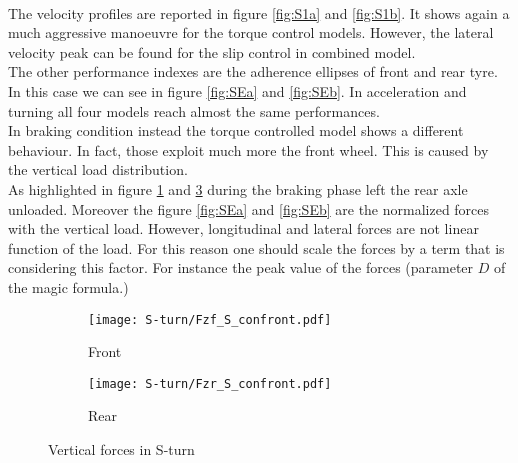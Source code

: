 %
\\
%
The velocity profiles are reported in figure \ref{fig:S1a} and \ref{fig:S1b}. It shows again a much aggressive manoeuvre for the torque control models. However, the lateral velocity peak can be found for the slip control in combined model.\\
The other performance indexes are the adherence ellipses of front and rear tyre. In this case we can see in figure \ref{fig:SEa} and \ref{fig:SEb}. In acceleration and turning all four models reach almost the same performances.\\
In braking condition instead the torque controlled model shows a different behaviour. In fact, those exploit much more the front wheel. This is caused by the vertical load distribution.\\ 
As highlighted in figure \ref{fig:SFZF} and \ref{fig:SFZR} during the braking phase left the rear axle unloaded. Moreover the figure \ref{fig:SEa} and \ref{fig:SEb} are the normalized forces with the vertical load. However, longitudinal and lateral forces are not linear function of the load. For this reason one should scale the forces by a term that is considering this factor. For instance the peak value of the forces (parameter $D$ of the magic formula\cite{pacejka2012tire}.)  
%
\begin{figure}[!htb]
    \begin{subfigure}{0.5\linewidth}
        \texttt{[image: S-turn/Fzf\_S\_confront.pdf]}
        \caption{Front}
        \label{fig:SFZF}
    \end{subfigure}%
    \begin{subfigure}{0.5\linewidth}
        \texttt{[image: S-turn/Fzr\_S\_confront.pdf]}
        \caption{Rear}
        \label{fig:SFZR}
    \end{subfigure}
    \caption{Vertical forces in S-turn}
\end{figure}
%